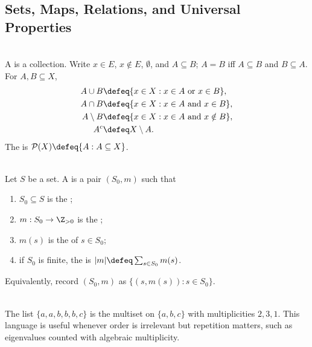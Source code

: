 \subsection{Sets, Maps, Relations, and Universal Properties}

\begin{definition} \label{def:analysis-sets-and-operations} \\
A  is a collection. Write $x\in E$, $x\notin E$, $\emptyset$, and $A\subseteq B$; $A=B$ iff $A\subseteq B$ and $B\subseteq A$. For $A,B\subseteq X$,
\begin{align}
A\cup B &\defeq \{x\in X:x\in A\text{ or }x\in B\}, \nonumber\\
A\cap B &\defeq \{x\in X:x\in A\text{ and }x\in B\}, \nonumber\\
A\setminus B &\defeq \{x\in X:x\in A\text{ and }x\notin B\}, \nonumber\\
A^c &\defeq X\setminus A. \nonumber
\end{align}
The  is $\mathcal{P}(X)\defeq\{A:A\subseteq X\}$.
\end{definition}

\begin{definition} \label{def:multisets-and-multiplicity} \\
Let $S$ be a set. A  is a pair $(S_0,m)$ such that
\begin{enumerate}[label=(\roman*)]
\setlength{\itemsep}{0pt}
\item $S_0\subseteq S$ is the ;
\item $m:S_0\to\Z_{>0}$ is the ;
\item $m(s)$ is the  of $s\in S_0$;
\item if $S_0$ is finite, the  is $\lvert m\rvert\defeq\sum_{s\in S_0}m(s)$.
\end{enumerate}
Equivalently, record $(S_0,m)$ as $\{(s,m(s)):s\in S_0\}$.
\end{definition}

\begin{example} \label{ex:multiset-eigenvalue-bookkeeping} \\
The list $\{a,a,b,b,b,c\}$ is the multiset on $\{a,b,c\}$ with multiplicities $2,3,1$.
This language is useful whenever order is irrelevant but repetition matters, such as eigenvalues counted with algebraic multiplicity.
\end{example}

